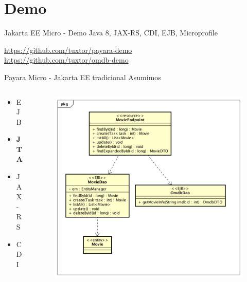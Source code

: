 \documentclass{beamer}
\begin{document}
\section{Demo}
\begin{frame}{Jakarta EE Micro  - Demo}
\huge Java 8, JAX-RS, CDI, EJB, Microprofile

\normalsize  \url{https://github.com/tuxtor/payara-demo}\\
\normalsize  \url{https://github.com/tuxtor/omdb-demo}
\end{frame}

\begin{frame}{Payara Micro - Jakarta EE tradicional}
Asumimos
\begin{columns}[T] %
\begin{column}[T]{3cm} %
\begin{itemize}
\item EJB
\item \textbf{JTA}
\item JAX-RS
\item CDI
\end{itemize}
\end{column}
\begin{column}[T]{7cm} %
\begin{figure}
\centering
\includegraphics[width=\linewidth]{Images/democlass}
\end{figure}
\end{column}
\end{columns}
\end{frame}
\end{document}
